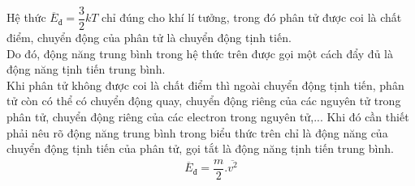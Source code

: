 {Hệ thức $\overline{E}_{\text{đ}}=\dfrac{3}{2}kT$ chỉ đúng cho khí lí tưởng, trong đó phân tử được coi là chất điểm, chuyển động của phân tử là chuyển động tịnh tiến.\\
Do đó, động năng trung bình trong hệ thức trên được gọi một cách đẩy đủ là động năng tịnh tiến trung bình.\\
Khi phân tử không được coi là chất điểm thì ngoài chuyển động tịnh tiến, phân tử còn có thể có chuyển động quay, chuyển động riêng của các nguyên tử trong phân tử, chuyển động riêng của các electron trong nguyên tử,... Khi đó cần thiết phải nêu rõ động năng trung bình trong biểu thức trên chỉ là động năng của chuyển động tịnh tiến của phân tử, gọi tắt là động năng tịnh tiến trung bình.
\begin{align*}
	\overline{E}_{\text{đ}}=\dfrac{m}{2}.\overline{v^2}
\end{align*}
} 
